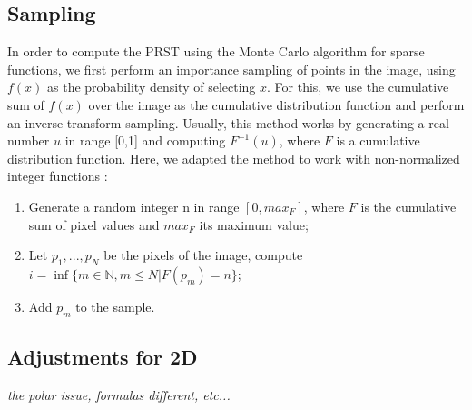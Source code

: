 \documentclass[10pt,a4paper]{article}			%
\begin{document}
	\subsection{Sampling}
In order to compute the PRST using the Monte Carlo algorithm for sparse functions, we first perform an importance sampling of points in the image, using $f(x)$  as the probability density of selecting $x$. For this, we use the cumulative sum of $f(x)$ over the image as the cumulative distribution function and perform an inverse transform sampling. Usually, this method works by generating a real number $u$ in range [0,1] and computing $F^{-1}(u)$, where $F$ is a cumulative distribution function. Here, we adapted the method to work with non-normalized integer functions :
\begin{enumerate}
\item Generate a random integer n in range $[0,max_F]$, where $F$ is the cumulative sum of pixel values and $max_F$ its maximum value;
\item Let $p_1,...,p_N$ be the pixels of the image, compute $i=\inf\{m\in \mathbb{N}, m\leq N |  F(p_m) = n\}$;
\item Add $p_m$ to the sample.
\end{enumerate}



	\subsection{Adjustments for 2D}
	
\textit{	the polar issue, formulas different, etc...\\}
\end{document}
